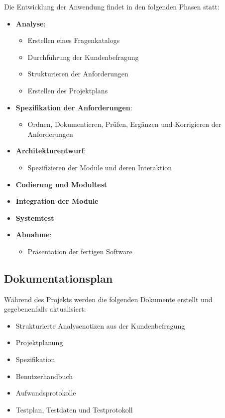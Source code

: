 \documentclass[11pt]{article}
\begin{document}
Die Entwicklung der Anwendung findet in den folgenden Phasen statt:
\begin{itemize}
	\item \textbf{Analyse}:
	\begin{itemize}
		\item Erstellen eines Fragenkatalogs
		\item Durchführung der Kundenbefragung
		\item Strukturieren der Anforderungen
		\item Erstellen des Projektplans
	\end{itemize}
	\item \textbf{Spezifikation der Anforderungen}:
	\begin{itemize}
		\item Ordnen, Dokumentieren, Prüfen, Ergänzen und Korrigieren der Anforderungen
	\end{itemize}
	\item \textbf{Architekturentwurf}:
	\begin{itemize}
		\item Spezifizieren der Module und deren Interaktion
	\end{itemize}
	\item \textbf{Codierung und Modultest}
	\item \textbf{Integration der Module}
	\item \textbf{Systemtest}
	\item \textbf{Abnahme}:
	\begin{itemize}
		\item Präsentation der fertigen Software
	\end{itemize}
\end{itemize}

\newpage

\subsection{Dokumentationsplan}

Während des Projekts werden die folgenden Dokumente erstellt und gegebenenfalls aktualisiert:
\begin{itemize}
	\item Strukturierte Analysenotizen aus der Kundenbefragung
	\item Projektplanung
	\item Spezifikation
	\item Benutzerhandbuch
	\item Aufwandsprotokolle
	\item Testplan, Testdaten und Testprotokoll
\end{itemize}
\end{document}
